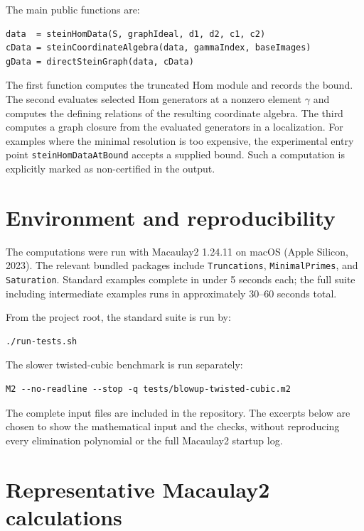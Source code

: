 \documentclass[a4paper,11pt]{article}
\begin{document}
The main public functions are:

\begin{lstlisting}
data  = steinHomData(S, graphIdeal, d1, d2, c1, c2)
cData = steinCoordinateAlgebra(data, gammaIndex, baseImages)
gData = directSteinGraph(data, cData)
\end{lstlisting}

The first function computes the truncated Hom module and records the bound. The second
evaluates selected Hom generators at a nonzero element $\gamma$ and computes the defining
relations of the resulting coordinate algebra. The third computes a graph closure from
the evaluated generators in a localization. For examples where the minimal resolution
is too expensive, the experimental entry point
\texttt{steinHomDataAtBound} accepts a supplied bound. Such a computation is explicitly
marked as non-certified in the output.

\section{Environment and reproducibility}

The computations were run with Macaulay2 1.24.11 on macOS (Apple Silicon, 2023). The relevant
bundled packages include \texttt{Truncations}, \texttt{MinimalPrimes}, and \texttt{Saturation}.
Standard examples complete in under 5 seconds each; the full suite including intermediate
examples runs in approximately 30--60 seconds total.

From the project root, the standard suite is run by:

\begin{verbatim}
./run-tests.sh
\end{verbatim}

The slower twisted-cubic benchmark is run separately:

\begin{verbatim}
M2 --no-readline --stop -q tests/blowup-twisted-cubic.m2
\end{verbatim}

The complete input files are included in the repository. The excerpts below are chosen
to show the mathematical input and the checks, without reproducing every elimination
polynomial or the full Macaulay2 startup log.

\section{Representative Macaulay2 calculations}
\end{document}
